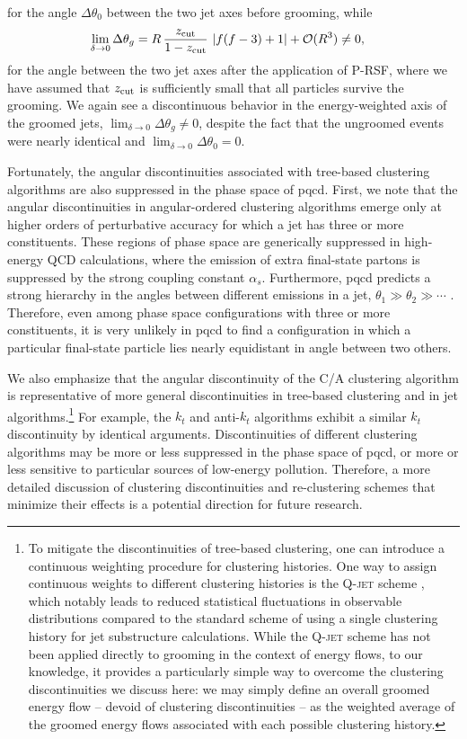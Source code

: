 for the angle \(\Delta\theta_0\) between the two jet axes before grooming, while
\begin{align}
    \lim_{\delta\to 0}\Delta\theta_g
    &=
    R\,\frac{z_{\rm cut}}{1-z_{\rm cut}}\,\left|f(f-3)+1\right|
    +
    \mathcal{O}(R^3)
    \neq 0
    ,
\end{align}
for the angle between the two jet axes after the application of P-RSF, where we have assumed that \(z_{\rm cut}\) is sufficiently small that all particles survive the grooming.
%
We again see a discontinuous behavior in the energy-weighted axis of the groomed jets, \(\lim_{\delta\to 0}\Delta\theta_g \neq 0\), despite the fact that the ungroomed events were nearly identical and \(\lim_{\delta\to 0}\Delta\theta_0 = 0\).


Fortunately, the angular discontinuities associated with tree-based clustering algorithms are also suppressed in the phase space of \gls{pqcd}.
%
First, we note that the angular discontinuities in angular-ordered clustering algorithms emerge only at higher orders of perturbative accuracy for which a jet has three or more constituents.
%
These regions of phase space are generically suppressed in high-energy QCD calculations, where the emission of extra final-state partons is suppressed by the strong coupling constant \(\alpha_s\).
%
Furthermore, \gls{pqcd} predicts a strong hierarchy in the angles between different emissions in a jet, \(\theta_1 \gg \theta_2 \gg \cdots\) \cite{Collins:2011zzd}.
%
Therefore, even among phase space configurations with three or more constituents, it is very unlikely in \gls{pqcd} to find a configuration in which a particular final-state particle lies nearly equidistant in angle between two others.

We also emphasize that the angular discontinuity of the C/A clustering algorithm is representative of more general discontinuities in tree-based clustering and in jet algorithms.\footnote{
To mitigate the discontinuities of tree-based clustering, one can introduce a continuous weighting procedure for clustering histories.
%
One way to assign continuous weights to different clustering histories is the \textsc{Q-jet} scheme \cite{Ellis:2012sn,Ellis:2014eya}, which notably leads to reduced statistical fluctuations in observable distributions compared to the standard scheme of using a single clustering history for jet substructure calculations.
%
While the \textsc{Q-jet} scheme has not been applied directly to grooming in the context of energy flows, to our knowledge, it provides a particularly simple way to overcome the clustering discontinuities we discuss here:
%
we may simply define an overall groomed energy flow -- devoid of clustering discontinuities -- as the weighted average of the groomed energy flows associated with each possible clustering history.
}
%
For example, the \(k_t\) and anti-\(k_t\) algorithms exhibit a similar \(k_t\) discontinuity by identical arguments.
%
Discontinuities of different clustering algorithms may be more or less suppressed in the phase space of \gls{pqcd}, or more or less sensitive to particular sources of low-energy pollution.
%
Therefore, a more detailed discussion of clustering discontinuities and re-clustering schemes that minimize their effects is a potential direction for future research.


